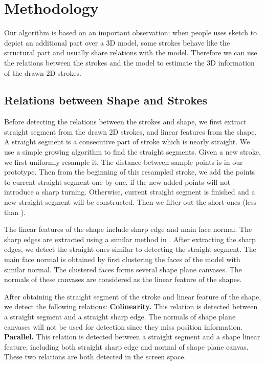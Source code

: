 \section{Methodology}

Our algorithm is based on an important observation: when people uses sketch to depict an additional part over a 3D model, some strokes behave like the structural part and usually share relations with the model. Therefore we can use the relations between the strokes and the model to estimate the 3D information of the drawn 2D strokes. 


\subsection{Relations between Shape and Strokes}


Before detecting the relations between the strokes and shape, we first extract straight segment from the drawn 2D strokes, and linear features from the shape. A straight segment is a consecutive part of stroke which is nearly straight. We use a simple growing algorithm to find the straight segments. Given a new stroke, we first uniformly resample it. The distance between sample points is \ca{10px} in our prototype. Then from the beginning of this resampled stroke, we add the points to current straight segment one by one, if the new added points will not introduce a sharp turning. Otherwise, current straight segment is finished and a new straight segment will be constructed. Then we filter out the short ones (less than \ca{50px}).

The linear features of the shape include sharp edge and main face normal. The sharp edges are extracted using a similar method in \ca{[Iwire]}. After extracting the sharp edges, we detect the straight ones similar to detecting the straight segment. The main face normal is obtained by first clustering the faces of the model with similar normal. The clustered faces forms several shape plane canvases. The normals of these canvases are considered as the linear feature of the shapes.

%
After obtaining the straight segment of the stroke and linear feature of the shape, we detect the following relations:
\textbf{Colinearity.} This relation is detected between a straight segment and a straight sharp edge. The normals of shape plane canvases will not be used for detection since they miss position information.
\textbf{Parallel.} This relation is detected between a straight segment and a shape linear feature, including both straight sharp edge and normal of shape plane canvas.
These two relations are both detected in the screen space.

